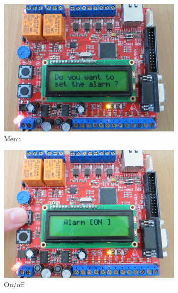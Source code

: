 \documentclass[12pt,a4paper]{article}
\begin{document}
\begin{figure}[!h]
        \centering
        \begin{subfigure}[b]{0.4\textwidth}
                \includegraphics[width=\textwidth]{photos/IMG_2151.JPG}
                \caption{Menu}
                \label{fig:questionalarme}
        \end{subfigure}
          \begin{subfigure}[b]{0.4\textwidth}
                \includegraphics[width=\textwidth]{photos/IMG_2156.JPG}
                \caption{On/off}
                \label{fig:activeralarme}
        \end{subfigure}
        \begin{subfigure}[b]{0.4\textwidth}

\end{subfigure}
\end{figure}
\end{document}
